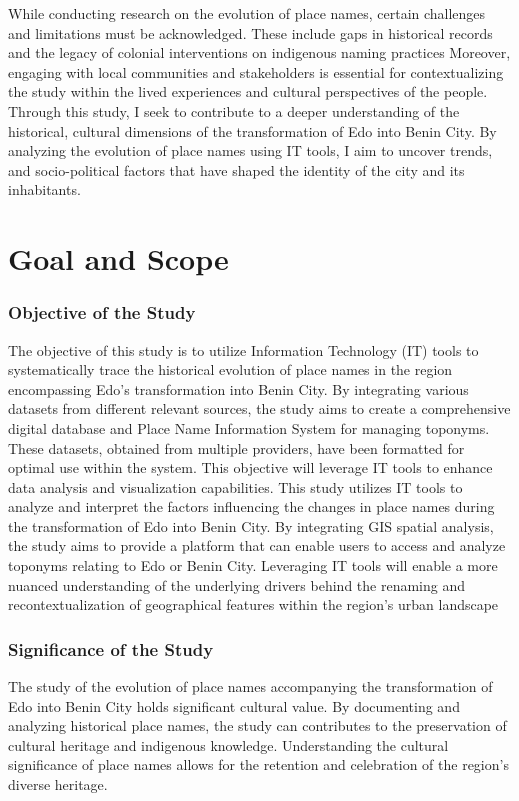 While conducting research on the evolution of place names, certain challenges and limitations must be acknowledged. These include gaps in historical records and the legacy of colonial interventions on indigenous naming practices Moreover, engaging with local communities and stakeholders is essential for contextualizing the study within the lived experiences and cultural perspectives of the people.
Through this study, I seek to contribute to a deeper understanding of the historical, cultural dimensions of the transformation of Edo into Benin City. By analyzing the evolution of place names using IT tools, I aim to uncover trends, and socio-political factors that have shaped the identity of the city and its inhabitants.

\section{Goal and Scope}
\subsubsection{Objective of the Study}
The objective of this study is to utilize Information Technology (IT) tools to systematically trace the historical evolution of place names in the region encompassing Edo's transformation into Benin City. By integrating various datasets from different relevant sources, the study aims to create a comprehensive digital database and Place Name Information System for managing toponyms. These datasets, obtained from multiple providers, have been formatted for optimal use within the system. This objective will leverage IT tools to enhance data analysis and visualization capabilities.
This study utilizes IT tools to analyze and interpret the factors influencing the changes in place names during the transformation of Edo into Benin City. By integrating GIS spatial analysis, the study aims to provide a platform that can enable users to access and analyze toponyms relating to Edo or Benin City. Leveraging IT tools will enable a more nuanced understanding of the underlying drivers behind the renaming and recontextualization of geographical features within the region's urban landscape
\subsubsection{Significance of the Study}
The study of the evolution of place names accompanying the transformation of Edo into Benin City holds significant cultural value. By documenting and analyzing historical place names, the study can contributes to the preservation of cultural heritage and indigenous knowledge. Understanding the cultural significance of place names allows for the retention and celebration of the region's diverse heritage. 

